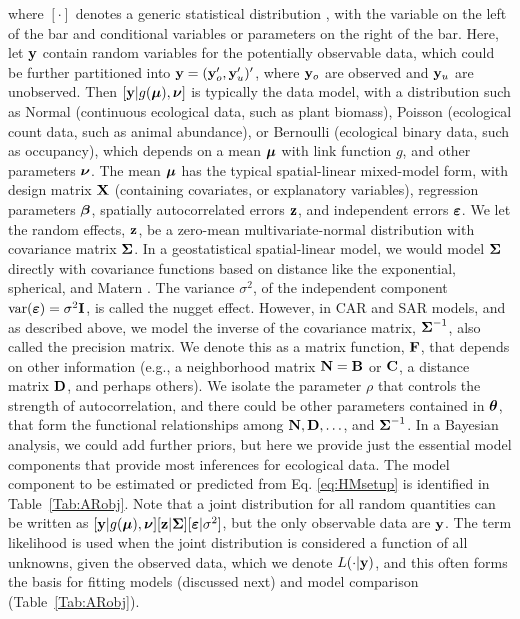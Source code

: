 \documentclass[11pt, titlepage]{article}\usepackage[]{graphicx}\usepackage[]{color}
\begin{document}
\begin{spacing}{1.9}
\begin{flushleft}
where $[\cdot]$ denotes a generic statistical distribution \citep{Gelf:Smit:samp:1990}, with the variable on the left of the bar and conditional variables or parameters on the right of the bar.  Here, let $\mathbf{y}$ contain random variables for the potentially observable data, which could be further partitioned into $\mathbf{y} = (\mathbf{y}_o^{\prime}, \mathbf{y}_u^{\prime})^{\prime}$, where $\mathbf{y}_o$ are observed and $\mathbf{y}_u$ are unobserved.  Then $[\mathbf{y}|g(\mbox{\boldmath $\mu$}), \mbox{\boldmath $\nu$}]$ is typically the data model, with a distribution such as Normal (continuous ecological data, such as plant biomass), Poisson (ecological count data, such as animal abundance), or Bernoulli (ecological binary data, such as occupancy), which depends on a mean $\mbox{\boldmath $\mu$}$ with link function $g$, and other parameters $\mbox{\boldmath $\nu$}$.  The mean $\mbox{\boldmath $\mu$}$ has the typical spatial-linear mixed-model form, with design matrix $\mathbf{X}$ (containing covariates, or explanatory variables), regression parameters $\mbox{\boldmath $\beta$}$, spatially autocorrelated errors $\mathbf{z}$, and independent errors $\mbox{\boldmath $\varepsilon$}$.  We let the random effects, $\mathbf{z}$, be a zero-mean multivariate-normal distribution with covariance matrix $\mbox{\boldmath $\Sigma$}$.  In a geostatistical spatial-linear model, we would model $\mbox{\boldmath $\Sigma$}$ directly with covariance functions based on distance like the exponential, spherical, and Matern \citep{Chil:Delf:geos:1999}. The variance $\sigma^2$, of the independent component $\textrm{var}(\mbox{\boldmath $\varepsilon$}) = \sigma^2\mathbf{I}$, is called the nugget effect.  However, in CAR and SAR models, and as described above, we model the inverse of the covariance matrix, $\mbox{\boldmath $\Sigma$}^{-1}$, also called the precision matrix.  We denote this as a matrix function, $\mathbf{F}$, that depends on other information (e.g., a neighborhood matrix $\mathbf{N} = \mathbf{B}$ or $\mathbf{C}$, a distance matrix $\mathbf{D}$, and perhaps others). We isolate the parameter $\rho$ that controls the strength of autocorrelation, and there could be other parameters contained in $\mbox{\boldmath $\theta$}$, that form the functional relationships among $\mathbf{N}, \mathbf{D}, \ldots$, and $\mbox{\boldmath $\Sigma$}^{-1}$. In a Bayesian analysis, we could add further priors, but here we provide just the essential model components that provide most inferences for ecological data.  The model component to be estimated or predicted from Eq. \ref{eq:HMsetup} is identified in Table~\ref{Tab:ARobj}.  Note that a joint distribution for all random quantities can be written as $[\mathbf{y}|g(\mbox{\boldmath $\mu$}),\mbox{\boldmath $\nu$}][\mathbf{z}|\mbox{\boldmath $\Sigma$}][\mbox{\boldmath $\varepsilon$}|\sigma^2]$, but the only observable data are $\mathbf{y}$. The term likelihood is used when the joint distribution is considered a function of all unknowns, given the observed data, which we denote $L(\cdot|\mathbf{y})$, and this often forms the basis for fitting models (discussed next) and model comparison (Table~\ref{Tab:ARobj}).


\end{flushleft}
\end{spacing}
\end{document}
